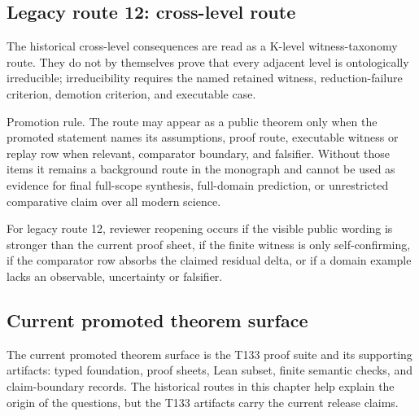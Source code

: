 \subsection{Legacy route 12: cross-level route}

The historical cross-level consequences are read as a K-level witness-taxonomy route. They do not by themselves prove that every adjacent level is ontologically irreducible; irreducibility requires the named retained witness, reduction-failure criterion, demotion criterion, and executable case.


Promotion rule. The route may appear as a public theorem only when the promoted statement names its assumptions, proof route, executable witness or replay row when relevant, comparator boundary, and falsifier. Without those items it remains a background route in the monograph and cannot be used as evidence for final full-scope synthesis, full-domain prediction, or unrestricted comparative claim over all modern science.


For legacy route 12, reviewer reopening occurs if the visible public wording is stronger than the current proof sheet, if the finite witness is only self-confirming, if the comparator row absorbs the claimed residual delta, or if a domain example lacks an observable, uncertainty or falsifier.


\subsection{Current promoted theorem surface}

The current promoted theorem surface is the T133 proof suite and its supporting artifacts: typed foundation, proof sheets, Lean subset, finite semantic checks, and claim-boundary records. The historical routes in this chapter help explain the origin of the questions, but the T133 artifacts carry the current release claims.
